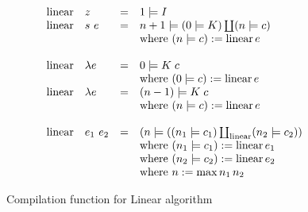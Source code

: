 \documentclass[conference]{IEEEtran}
\DeclareMathOperator{\linear}{linear}
\begin{document}
\begin{figure}
    \begin{equation*}
        \begin{array}{l l l l}
            \linear & z         & = & 1 \models I                                                              \\
            \linear & s \ e     & = & n+1 \models (0 \models K) \coprod (n \models c)                          \\
                    &           &   & \text{where } (n \models c) := \linear e                                 \\
            \\
            \linear & \lambda e & = & 0 \models K \; c                                                         \\
                    &           &   & \text{where } (0 \models c) := \linear e                                 \\
            \linear & \lambda e & = & (n-1) \models K \; c                                                     \\
                    &           &   & \text{where } (n \models c) := \linear e                                 \\
            \\
            \linear & e_1 \ e_2 & = & (n \models ((n_1 \models c_1) \coprod_{\text{linear}} (n_2 \models c_2)) \\
                    &           &   & \text{where } (n_1 \models c_1) := \linear e_1                           \\
                    &           &   & \text{where } (n_2 \models c_2) := \linear e_2                           \\
                    &           &   & \text{where } n := \max n_1 \, n_2                                       \\
        \end{array}
    \end{equation*}
    \centering
    \caption{Compilation function for Linear algorithm}
    \label{fig:linear}
\end{figure}
\end{document}
